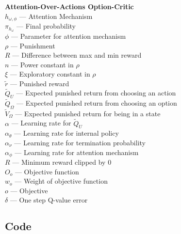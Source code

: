 \documentclass{article}
\begin{document}
	{\bfseries Attention-Over-Actions Option-Critic}\\
	$h_{\omega,\phi}$ --- Attention Mechanism\\
	$\pi_{h_\omega}$ --- Final probability\\
	$\phi$ --- Parameter for attention mechanism\\
	$\rho$ --- Punishment\\
	$R$ --- Difference between max and min reward\\
	$n$ --- Power constant in $\rho$\\
	$\xi$ --- Exploratory constant in $\rho$\\
	$\widetilde{r}$ --- Punished reward\\
	$\widetilde{Q}_U$ --- Expected punished return from choosing an action\\
	$\widetilde{Q}_\Omega$ --- Expected punished return from choosing an option\\
	$\widetilde{V}_\Omega$ --- Expected punished return for being in a state\\
	$\alpha$ --- Learning rate for $\widetilde{Q}_U$\\
	$\alpha_\theta$ --- Learning rate for internal policy\\
	$\alpha_\nu$ --- Learning rate for termination probability\\
	$\alpha_\phi$ --- Learning rate for attention mechanism\\
	$R$ --- Minimum reward clipped by 0\\
	$O_o$ --- Objective function\\
	$w_o$ --- Weight of objective function\\
	$o$ --- Objective\\
	$\delta$ --- One step Q-value error
	\subsection*{Code}
\end{document}
